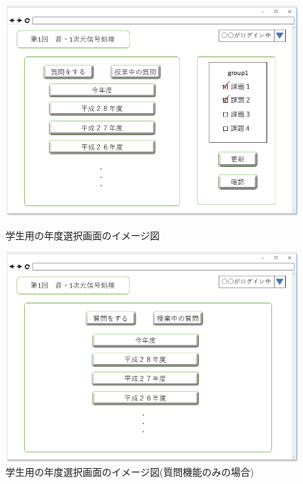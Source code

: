 \begin{figure}[htbp]
 \begin{minipage}{0.5\hsize}
  \begin{center}
   \includegraphics[width=1\linewidth,clip]{./img/30.png}
  \end{center}
  \caption{学生用の年度選択画面のイメージ図　　　　　　　　　　}\label{fig:30}
 \end{minipage}
 \begin{minipage}{0.5\hsize}
  \begin{center}
   \includegraphics[width=1\linewidth,clip]{./img/31.png}
  \end{center}
  \caption{学生用の年度選択画面のイメージ図(質問機能のみの場合)}\label{fig:31}
 \end{minipage}
\end{figure}

